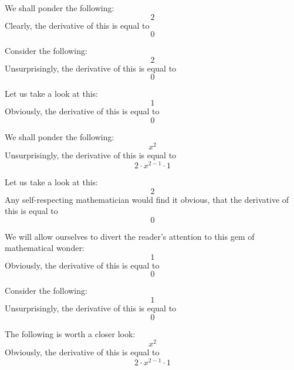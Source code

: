 \documentclass{article}
\begin{document}
We shall ponder the following:
\begin{equation}
2 
\end{equation}
Clearly, the derivative of this is equal to
\begin{equation}
0 
\end{equation}

Consider the following:
\begin{equation}
2 
\end{equation}
Unsurprisingly, the derivative of this is equal to
\begin{equation}
0 
\end{equation}

Let us take a look at this:
\begin{equation}
1 
\end{equation}
Obviously, the derivative of this is equal to
\begin{equation}
0 
\end{equation}

We shall ponder the following:
\begin{equation}
x ^{2 } 
\end{equation}
Unsurprisingly, the derivative of this is equal to
\begin{equation}
2 \cdot x ^{2 - 1 } \cdot 1 
\end{equation}

Let us take a look at this:
\begin{equation}
2 
\end{equation}
Any self-respecting mathematician would find it obvious, that the derivative of this is equal to
\begin{equation}
0 
\end{equation}

We will allow ourselves to divert the reader's attention to this gem of mathematical wonder:
\begin{equation}
1 
\end{equation}
Obviously, the derivative of this is equal to
\begin{equation}
0 
\end{equation}

Consider the following:
\begin{equation}
1 
\end{equation}
Unsurprisingly, the derivative of this is equal to
\begin{equation}
0 
\end{equation}

The following is worth a closer look:
\begin{equation}
x ^{2 } 
\end{equation}
Obviously, the derivative of this is equal to
\begin{equation}
2 \cdot x ^{2 - 1 } \cdot 1 
\end{equation}
\end{document}
